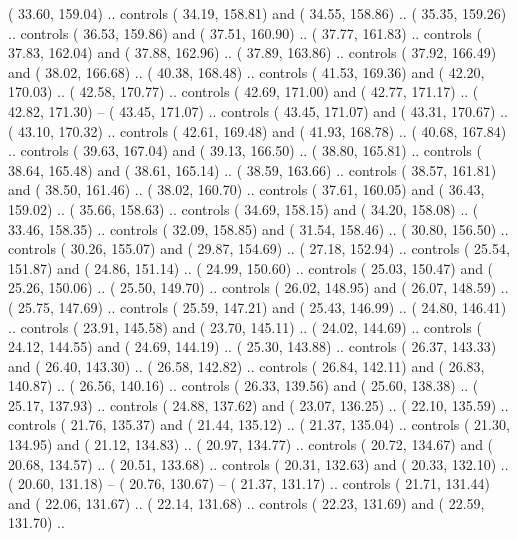 {        (  33.60, 159.04) .. controls (  34.19, 158.81) and (  34.55, 158.86) ..
        (  35.35, 159.26) .. controls (  36.53, 159.86) and (  37.51, 160.90) ..
        (  37.77, 161.83) .. controls (  37.83, 162.04) and (  37.88, 162.96) ..
        (  37.89, 163.86) .. controls (  37.92, 166.49) and (  38.02, 166.68) ..
        (  40.38, 168.48) .. controls (  41.53, 169.36) and (  42.20, 170.03) ..
        (  42.58, 170.77) .. controls (  42.69, 171.00) and (  42.77, 171.17) ..
        (  42.82, 171.30) -- 
        (  43.45, 171.07) .. controls (  43.45, 171.07) and (  43.31, 170.67) ..
        (  43.10, 170.32) .. controls (  42.61, 169.48) and (  41.93, 168.78) ..
        (  40.68, 167.84) .. controls (  39.63, 167.04) and (  39.13, 166.50) ..
        (  38.80, 165.81) .. controls (  38.64, 165.48) and (  38.61, 165.14) ..
        (  38.59, 163.66) .. controls (  38.57, 161.81) and (  38.50, 161.46) ..
        (  38.02, 160.70) .. controls (  37.61, 160.05) and (  36.43, 159.02) ..
        (  35.66, 158.63) .. controls (  34.69, 158.15) and (  34.20, 158.08) ..
        (  33.46, 158.35) .. controls (  32.09, 158.85) and (  31.54, 158.46) ..
        (  30.80, 156.50) .. controls (  30.26, 155.07) and (  29.87, 154.69) ..
        (  27.18, 152.94) .. controls (  25.54, 151.87) and (  24.86, 151.14) ..
        (  24.99, 150.60) .. controls (  25.03, 150.47) and (  25.26, 150.06) ..
        (  25.50, 149.70) .. controls (  26.02, 148.95) and (  26.07, 148.59) ..
        (  25.75, 147.69) .. controls (  25.59, 147.21) and (  25.43, 146.99) ..
        (  24.80, 146.41) .. controls (  23.91, 145.58) and (  23.70, 145.11) ..
        (  24.02, 144.69) .. controls (  24.12, 144.55) and (  24.69, 144.19) ..
        (  25.30, 143.88) .. controls (  26.37, 143.33) and (  26.40, 143.30) ..
        (  26.58, 142.82) .. controls (  26.84, 142.11) and (  26.83, 140.87) ..
        (  26.56, 140.16) .. controls (  26.33, 139.56) and (  25.60, 138.38) ..
        (  25.17, 137.93) .. controls (  24.88, 137.62) and (  23.07, 136.25) ..
        (  22.10, 135.59) .. controls (  21.76, 135.37) and (  21.44, 135.12) ..
        (  21.37, 135.04) .. controls (  21.30, 134.95) and (  21.12, 134.83) ..
        (  20.97, 134.77) .. controls (  20.72, 134.67) and (  20.68, 134.57) ..
        (  20.51, 133.68) .. controls (  20.31, 132.63) and (  20.33, 132.10) ..
        (  20.60, 131.18) -- 
        (  20.76, 130.67) -- 
        (  21.37, 131.17) .. controls (  21.71, 131.44) and (  22.06, 131.67) ..
        (  22.14, 131.68) .. controls (  22.23, 131.69) and (  22.59, 131.70) ..
}
